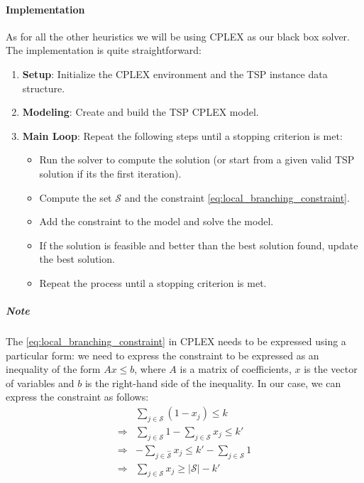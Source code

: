 \documentclass{article}
\begin{document}
\paragraph{Implementation}
As for all the other heuristics we will be using CPLEX as our black box solver. 
The implementation is quite straightforward:
\begin{enumerate}
	\item \textbf{Setup}: Initialize the CPLEX environment and the TSP instance data structure.
	\item \textbf{Modeling}: Create and build the TSP CPLEX model.
	\item \textbf{Main Loop}: Repeat the following steps until a stopping criterion is met:
	      \begin{itemize}
				\item Run the solver to compute the solution (or start from a given valid TSP solution if its the first iteration).
				\item Compute the set $\mathcal{S}$ and the constraint \ref{eq:local_branching_constraint}.
				\item Add the constraint to the model and solve the model.
				\item If the solution is feasible and better than the best solution found, update the best solution.
				\item Repeat the process until a stopping criterion is met.
	      \end{itemize}
\end{enumerate}
\subparagraph{Note}
The \ref{eq:local_branching_constraint} in CPLEX needs to be expressed using a particular form: we need to express the constraint
to be expressed as an inequality of the form $Ax \leq b$, where $A$ is a matrix of coefficients, $x$ is the vector of variables and $b$ is the right-hand side of the inequality.
In our case, we can express the constraint as follows:
\begin{align}
	& \sum_{j \in \mathcal{S}} (1 - x_j) \leq k \\
	\Rightarrow & \sum_{j \in \mathcal{S}}1 -\sum_{j \in \mathcal{S}} x_j \leq k' \\
	\Rightarrow & -\sum_{j \in \hat{\mathcal{S}}} x_j \leq k' - \sum_{j \in \mathcal{S}}1 \\
	\Rightarrow & \sum_{j \in \mathcal{S}} x_j \geq |\mathcal{S}| - k'
\end{align}
\newpage





\end{document}
